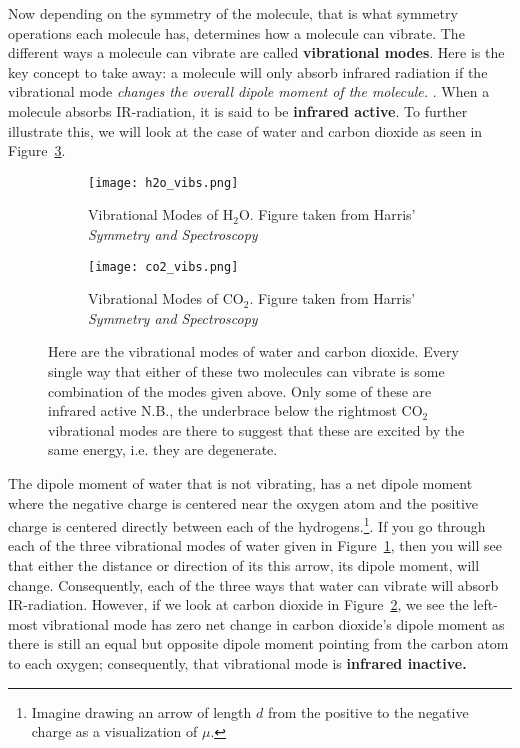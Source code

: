     Now depending on the symmetry of the molecule, that is what symmetry operations each molecule has, determines how a molecule can vibrate. The different ways a molecule can vibrate are called \textbf{vibrational modes}. Here is the key concept to take away: a molecule will only absorb infrared radiation if the vibrational mode \emph{changes the overall dipole moment of the molecule.} \citep{harris1978symmetry,atkins2014physical,bishop1993group}. When a molecule absorbs IR-radiation, it is said to be \textbf{infrared active}. To further illustrate this, we will look at the case of water and carbon dioxide as seen in Figure~\ref{fig:vib_modes}. 

    \begin{figure}[hb]
     \begin{center}
        \begin{subfigure}[b]{0.6\textwidth}
            \texttt{[image: h2o\_vibs.png]}
            \caption{Vibrational Modes of H$_2$O. Figure taken from Harris' \emph{Symmetry and Spectroscopy} \citep{harris1978symmetry}}
            \label{fig:h2o_vibs}         
        \end{subfigure}
        \begin{subfigure}[b]{0.6\textwidth}
            \texttt{[image: co2\_vibs.png]}
            \caption{Vibrational Modes of CO$_2$. Figure taken from Harris' \emph{Symmetry and Spectroscopy} \citep{harris1978symmetry}}
            \label{fig:co2_vibs}         
        \end{subfigure}
        \caption{Here are the vibrational modes of water and carbon dioxide. Every single way that either of these two molecules can vibrate is some combination of the modes given above. Only some of these are infrared active \citep{harris1978symmetry} N.B., the underbrace below the rightmost CO$_2$ vibrational modes are there to suggest that these are excited by the same energy, i.e. they are degenerate.}
        \label{fig:vib_modes}
     \end{center}
    \end{figure}    

    The dipole moment of water that is not vibrating, has a net dipole moment where the negative charge is centered near the oxygen atom and the positive charge is centered directly between each of the hydrogens.\footnote{
        Imagine drawing an arrow of length $d$ from the positive to the negative charge as a visualization of $\mu.$
        }. 
    If you go through each of the three vibrational modes of water given in Figure~\ref{fig:h2o_vibs}, then you will see that either the distance or direction of its this arrow, its dipole moment, will change. Consequently, each of the three ways that water can vibrate will absorb IR-radiation. However, if we look at carbon dioxide in Figure~\ref{fig:co2_vibs}, we see the left-most vibrational mode has zero net change in carbon dioxide's dipole moment as there is still an equal but opposite dipole moment pointing from the carbon atom to each oxygen; consequently, that vibrational mode is \textbf{infrared inactive.}


